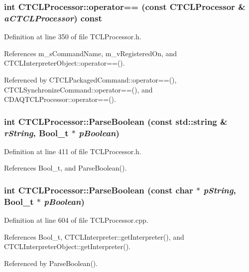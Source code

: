 \subsubsection{\setlength{\rightskip}{0pt plus 5cm}int CTCLProcessor::operator== (const CTCLProcessor \& {\em a\-CTCLProcessor}) const\hspace{0.3cm}{\tt  [inline]}}\label{classCTCLProcessor_a3}




Definition at line 350 of file TCLProcessor.h.

References m\_\-s\-Command\-Name, m\_\-v\-Registered\-On, and CTCLInterpreter\-Object::operator==().

Referenced by CTCLPackaged\-Command::operator==(), CTCLSynchronize\-Command::operator==(), and CDAQTCLProcessor::operator==().
\subsubsection{\setlength{\rightskip}{0pt plus 5cm}int CTCLProcessor::Parse\-Boolean (const std::string \& {\em r\-String}, {\bf Bool\_\-t} $\ast$ {\em p\-Boolean})\hspace{0.3cm}{\tt  [inline]}}\label{classCTCLProcessor_a14}




Definition at line 411 of file TCLProcessor.h.

References Bool\_\-t, and Parse\-Boolean().
\subsubsection{\setlength{\rightskip}{0pt plus 5cm}int CTCLProcessor::Parse\-Boolean (const char $\ast$ {\em p\-String}, {\bf Bool\_\-t} $\ast$ {\em p\-Boolean})}\label{classCTCLProcessor_a13}




Definition at line 604 of file TCLProcessor.cpp.

References Bool\_\-t, CTCLInterpreter::get\-Interpreter(), and CTCLInterpreter\-Object::get\-Interpreter().

Referenced by Parse\-Boolean().
